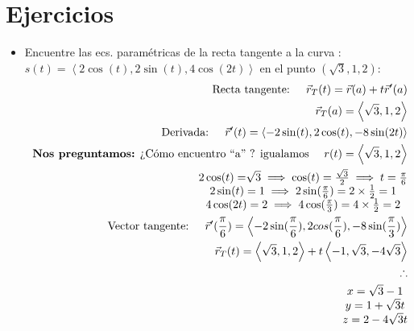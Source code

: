 \section{Ejercicios}
\begin{itemize}
    \item Encuentre las ecs. paramétricas de la recta tangente a la curva : $s(t)=\left\langle 2\cos(t),2\sin(t),4\cos(2t) \right\rangle $ en el punto $(\sqrt{3},1,2)$:
        \begin{align*}
            \text{  Recta tangente:  } \quad \vec{r}_T(t) = \vec{r}(a)+t \vec{r}'(a) \\ 
            \vec{r}_T(a) = \left\langle \sqrt{3},1,2 \right\rangle \\ 
            \text{  Derivada: } \quad \vec{r}'(t) = \left\langle -2\sin(t),2\cos(t),-8\sin(2t) \right\rangle \\ 
            \text{  \textbf{Nos preguntamos:} ¿Cómo encuentro ``a'' ? igualamos   } \quad r(t) = \left\langle \sqrt{3},1,2 \right\rangle  \\ 
            \begin{matrix}
                2\cos(t) = \sqrt[]{3} \implies \cos(t) = \frac{\sqrt{3}}{2} \implies t = \frac{\pi }{6}  \\ 
                2\sin(t) = 1 \implies 2\sin(\frac{\pi }{6} ) = 2 \times \frac{1}{2} = 1\\ 
                4 \cos(2t)=2 \implies 4\cos(\frac{\pi }{3} ) = 4 \times \frac{1}{2} = 2\\ 
            \end{matrix} \\ 
            \text{  Vector tangente:   } \quad \vec{r}'(\frac{\pi }{6} )= \left\langle -2\sin(\frac{\pi }{6}),2cos(\frac{\pi}{6} ), -8\sin(\frac{\pi }{3} )  \right\rangle \\ 
            \vec{r}_T(t)= \left\langle \sqrt{3},1,2 \right\rangle + t \left\langle -1,\sqrt{3},-4\sqrt{3} \right\rangle \\ 
            \therefore  \\ 
            \begin{matrix}
                x= \sqrt{3}-1 \\ 
                y=1+\sqrt{3}t \\ 
                z=2-4\sqrt{3}t \\ 
            \end{matrix}\\ 
        \end{align*}
\end{itemize}

















